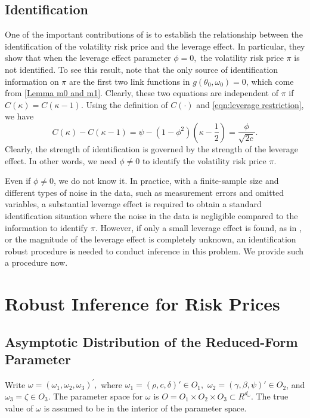 \documentclass[11pt, letterpaper, twoside]{article}
\begin{document}
\subsection{Identification}

One of the important contributions of \textcite{han2018leverage} is to establish the relationship between the identification of the volatility risk price and the leverage effect. In particular, they show that when the leverage effect parameter $\phi =0,$ the volatility risk price $\pi $ is not identified. To see this result, note that the only source of identification information on $\pi $ are the first two link functions in $g(\theta _{0},\omega _{0})=0$, 
which come from \cref{Lemma m0 and m1}. Clearly, these two equations are independent of $\pi$ if $C(\kappa )=C(\kappa -1)$. Using the definition of $C(\cdot)$ and \cref{eqn:leverage restriction}, we have 
%
\begin{equation}
    C(\kappa )-C(\kappa -1)=\psi -(1-\phi ^{2})\left( \kappa -\frac{1}{2}\right) = \frac{\phi}{\sqrt{2 c}}.
\end{equation}
%
Clearly, the strength of identification is governed by the strength of the leverage effect.
In other words, we need $\phi \neq 0$ to identify the volatility risk price $\pi$.

Even if $\phi \neq 0$, we do not know it. In practice, with a finite-sample size and different types of noise in the data, such as measurement errors and omitted variables, a substantial leverage effect is required to obtain a standard identification situation where the noise in the data is negligible compared to the information to identify $\pi$. However, if only a small leverage effect is found, as in \textcites{bandi2012timevarying, aitsahalia2013leverage}, or the magnitude of the leverage effect is completely unknown, an identification robust procedure is needed to conduct inference in this problem. We provide such a procedure now.

\section{Robust Inference for Risk Prices}\label{sec:robust inference}

\subsection{Asymptotic Distribution of the Reduced-Form Parameter}

Write $\omega = (\omega _{1},\omega _{2},\omega _{3})^{\prime },$ where $\omega _{1}=(\rho ,c,\delta)' \in O_{1},$ $\omega _{2}=(\gamma ,\beta ,\psi)' \in O_{2}$, and $\omega _{3}=\zeta \in O_{3}.$ The parameter space for $ \omega $ is $O=O_{1}\times O_{2}\times O_{3}\subset R^{d_{\omega }}$. The true value of $\omega $ is assumed to be in the interior of the parameter
space.
\end{document}
